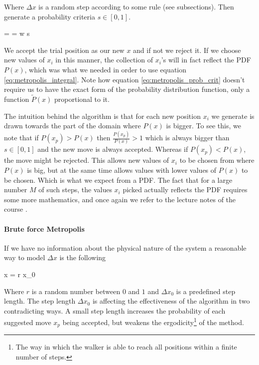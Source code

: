 Where $\Delta x$ is a random step according to some rule (see subsections).
Then generate a probability criteria $s \in [0,1]$.

\eqs {} =  =  \equiv w \geq s 
\label{eq:metropolis_prob_crit}\eqf

We accept the trial position as our new $x$ and if not we reject it. 
If we choose new values of $x_i$ in this manner, the collection of $x_i$'s will in fact reflect the PDF $P(x)$, which was what we needed in order to use equation \ref{eq:metropolis_integral}. 
Note how equation \ref{eq:metropolis_prob_crit} doesn't require us to have the exact form of the probability distribution function, only a function $\tilde{P}(x)$ proportional to it. 

The intuition behind the algorithm is that for each new position $x_i$ we generate is drawn towards the part of the domain where $P(x)$ is bigger. 
To see this, we note that if $P(x_p) > P(x)$ then $\frac{P(x_p)}{P(x)}>1$ which is always bigger than $s \in [0,1]$ and the new move is always accepted.
Whereas if $P(x_p)<P(x)$, the move might be rejected. 
This allows new values of $x_i$ to be chosen from where $P(x)$ is big, but at the same time allows values with lower values of $P(x)$ to be chosen. 
Which is what we expect from a PDF. 
The fact that for a large number $M$ of such steps, the values $x_i$ picked actually reflects the PDF requires some more mathematics, and once again we refer to the lecture notes of the course \cite{lecturenotes}.



\paragraph{Brute force Metropolis}

If we have no information about the physical nature of the system a reasonable way to model $\Delta x$ is the following

\eqs
\Delta x = r \Delta x_0
\eqf

Where $r$ is a random number between $0$ and $1$ and $\Delta x_0$ is a predefined step length. 
The step length $\Delta x_0$ is affecting the effectiveness of the algorithm in two contradicting ways. 
A small step length increases the probability of each suggested move $x_p$ being accepted, but weakens the ergodicity\footnote{The way in which the walker is able to reach all positions within a finite number of steps.}
of the method. 

